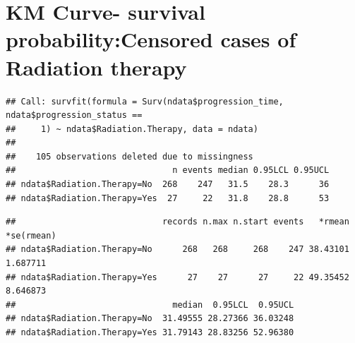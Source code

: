 \documentclass[
  11pt,
]{article}
\newenvironment{Shaded}{\begin{snugshade}}{\end{snugshade}}
\newcommand{\AttributeTok}[1]{\textcolor[rgb]{0.77,0.63,0.00}{#1}}
\newcommand{\DecValTok}[1]{\textcolor[rgb]{0.00,0.00,0.81}{#1}}
\newcommand{\FunctionTok}[1]{\textcolor[rgb]{0.00,0.00,0.00}{#1}}
\newcommand{\NormalTok}[1]{#1}
\newcommand{\OtherTok}[1]{\textcolor[rgb]{0.56,0.35,0.01}{#1}}
\newcommand{\SpecialCharTok}[1]{\textcolor[rgb]{0.00,0.00,0.00}{#1}}
\newcommand{\StringTok}[1]{\textcolor[rgb]{0.31,0.60,0.02}{#1}}
\begin{document}
\newpage
\section{KM Curve- survival probability:Censored cases of Radiation therapy}

\begin{Shaded}
\end{Shaded}

\begin{verbatim}
## Call: survfit(formula = Surv(ndata$progression_time, ndata$progression_status == 
##     1) ~ ndata$Radiation.Therapy, data = ndata)
## 
##    105 observations deleted due to missingness 
##                               n events median 0.95LCL 0.95UCL
## ndata$Radiation.Therapy=No  268    247   31.5    28.3      36
## ndata$Radiation.Therapy=Yes  27     22   31.8    28.8      53
\end{verbatim}

\begin{Shaded}
\end{Shaded}

\begin{verbatim}
##                             records n.max n.start events   *rmean *se(rmean)
## ndata$Radiation.Therapy=No      268   268     268    247 38.43101   1.687711
## ndata$Radiation.Therapy=Yes      27    27      27     22 49.35452   8.646873
##                               median  0.95LCL  0.95UCL
## ndata$Radiation.Therapy=No  31.49555 28.27366 36.03248
## ndata$Radiation.Therapy=Yes 31.79143 28.83256 52.96380
\end{verbatim}
\end{document}
